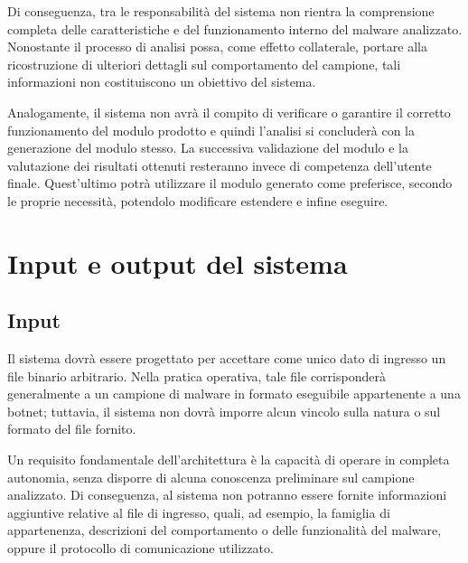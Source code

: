 Di conseguenza, tra le responsabilità del sistema non rientra la comprensione completa delle caratteristiche e del funzionamento interno del malware analizzato. Nonostante il processo di analisi possa, come effetto collaterale, portare alla ricostruzione di ulteriori dettagli sul comportamento del campione, tali informazioni non costituiscono un obiettivo del sistema.

Analogamente, il sistema non avrà il compito di verificare o garantire il corretto funzionamento del modulo prodotto e quindi l'analisi si concluderà con la generazione del modulo stesso. La successiva validazione del modulo e la valutazione dei risultati ottenuti resteranno invece di competenza dell'utente finale. Quest'ultimo potrà utilizzare il modulo generato come preferisce, secondo le proprie necessità, potendolo modificare estendere e infine eseguire.


\section{Input e output del sistema} %

\subsection{Input} %

Il sistema dovrà essere progettato per accettare come unico dato di ingresso un file binario arbitrario. Nella pratica operativa, tale file corrisponderà generalmente a un campione di malware in formato eseguibile appartenente a una botnet; tuttavia, il sistema non dovrà imporre alcun vincolo sulla natura o sul formato del file fornito.

Un requisito fondamentale dell'architettura è la capacità di operare in completa autonomia, senza disporre di alcuna conoscenza preliminare sul campione analizzato. Di conseguenza, al sistema non potranno essere fornite informazioni aggiuntive relative al file di ingresso, quali, ad esempio, la famiglia di appartenenza, descrizioni del comportamento o delle funzionalità del malware, oppure il protocollo di comunicazione utilizzato.

